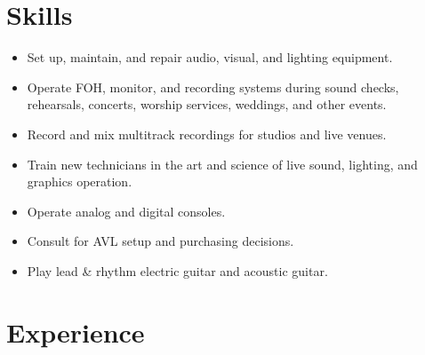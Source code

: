 \documentclass[12pt,sans,colorlinks,linkcolor=true]{moderncv}        %
\begin{document}
\hypersetup{urlcolor=links}
\makecvtitle
\section{Skills}

\begin{itemize}
\item Set up, maintain, and repair audio, visual, and lighting equipment.
\item Operate FOH, monitor, and recording systems during sound checks, rehearsals, concerts, worship services, weddings, and other events.
\item Record and mix multitrack recordings for studios and live venues.
\item Train new technicians in the art and science of live sound, lighting, and graphics operation.
\item Operate analog and digital consoles.
\item Consult for AVL setup and purchasing decisions.
\item Play lead \& rhythm electric guitar and acoustic guitar.
\end{itemize}
\section{Experience}

\end{document}
